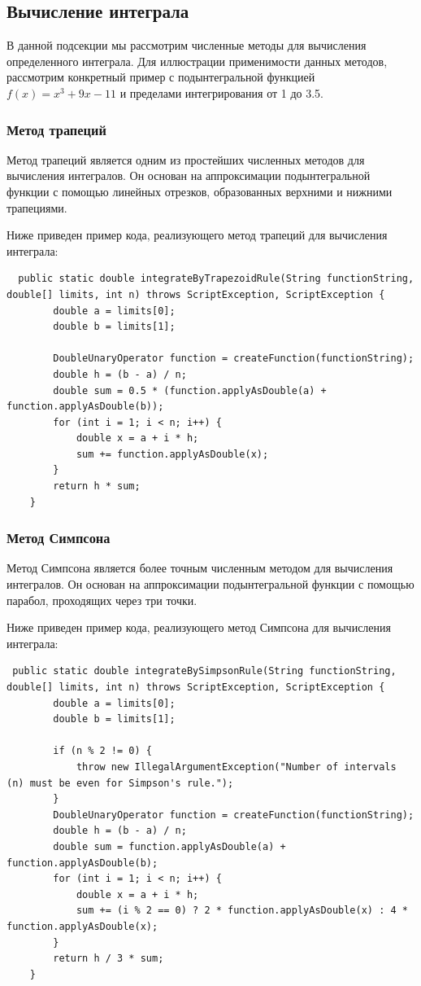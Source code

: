 \documentclass[12pt]{article}
\begin{document}
\subsection{Вычисление интеграла}

В данной подсекции мы рассмотрим численные методы для вычисления определенного интеграла. Для иллюстрации применимости данных методов, рассмотрим конкретный пример с подынтегральной функцией $f(x) = x^3 + 9x - 11$ и пределами интегрирования от 1 до 3.5.

\subsubsection{Метод трапеций}

Метод трапеций является одним из простейших численных методов для вычисления интегралов. Он основан на аппроксимации подынтегральной функции с помощью линейных отрезков, образованных верхними и нижними трапециями.

Ниже приведен пример кода, реализующего метод трапеций для вычисления интеграла:

\begin{verbatim}
  public static double integrateByTrapezoidRule(String functionString, double[] limits, int n) throws ScriptException, ScriptException {
        double a = limits[0];
        double b = limits[1];

        DoubleUnaryOperator function = createFunction(functionString);
        double h = (b - a) / n;
        double sum = 0.5 * (function.applyAsDouble(a) + function.applyAsDouble(b));
        for (int i = 1; i < n; i++) {
            double x = a + i * h;
            sum += function.applyAsDouble(x);
        }
        return h * sum;
    }
\end{verbatim}

\subsubsection{Метод Симпсона}

Метод Симпсона является более точным численным методом для вычисления интегралов. Он основан на аппроксимации подынтегральной функции с помощью парабол, проходящих через три точки.

Ниже приведен пример кода, реализующего метод Симпсона для вычисления интеграла:

\begin{verbatim}
 public static double integrateBySimpsonRule(String functionString, double[] limits, int n) throws ScriptException, ScriptException {
        double a = limits[0];
        double b = limits[1];

        if (n % 2 != 0) {
            throw new IllegalArgumentException("Number of intervals (n) must be even for Simpson's rule.");
        }
        DoubleUnaryOperator function = createFunction(functionString);
        double h = (b - a) / n;
        double sum = function.applyAsDouble(a) + function.applyAsDouble(b);
        for (int i = 1; i < n; i++) {
            double x = a + i * h;
            sum += (i % 2 == 0) ? 2 * function.applyAsDouble(x) : 4 * function.applyAsDouble(x);
        }
        return h / 3 * sum;
    }
\end{verbatim}
\end{document}
